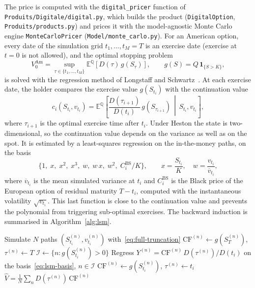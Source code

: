 \documentclass[11pt,a4paper]{article}
\theoremstyle{remark}
\newcommand{\E}{\mathbb{E}}
\newcommand{\Q}{\mathbb{Q}}
\newcommand{\ind}{\mathbf{1}}
\newcommand{\code}[1]{\texttt{#1}}
\begin{document}
The price is computed with the \code{digital\_pricer} function of
\code{Produits/Digitale/digital.py}, which builds the product
(\code{DigitalOption}, \code{Produits/products.py}) and prices it with the
model-agnostic Monte Carlo engine \code{MonteCarloPricer}
(\code{Model/monte\_carlo.py}). For an American option, every date of the
simulation grid $t_1, \dots, t_M = T$ is an exercise date (exercise at $t=0$ is
not allowed), and the optimal stopping problem
\begin{equation}
  V^{\mathrm{Am}}_0 = \sup_{\tau \in \{t_1,\dots,t_M\}} \E^{\Q}\!\left[D(\tau)\,g(S_\tau)\right],
  \qquad g(S) = Q\,\ind_{\{S > K\}},
\end{equation}
is solved with the regression method of Longstaff and Schwartz~\cite{LongstaffSchwartz2001}.
At each exercise date, the holder compares the exercise value $g(S_{t_i})$ with
the continuation value
\begin{equation}
  c_i(S_{t_i}, v_{t_i}) = \E^{\Q}\!\left[\frac{D(\tau_{i+1})}{D(t_i)}\,g(S_{\tau_{i+1}})
  \,\middle|\, S_{t_i}, v_{t_i}\right],
\end{equation}
where $\tau_{i+1}$ is the optimal exercise time after $t_i$. Under Heston the
state is two-dimensional, so the continuation value depends on the variance as
well as on the spot. It is estimated by a least-squares regression on the
in-the-money paths, on the basis
\begin{equation}
  \bigl\{1,\; x,\; x^2,\; x^3,\; w,\; w\,x,\; w^2,\; C^{\mathrm{BS}}_i/K\bigr\},
  \qquad x = \frac{S_{t_i}}{K},\quad w = \frac{v_{t_i}}{\overline{v}_{t_i}},
  \label{eq:lsm-basis}
\end{equation}
where $\overline{v}_{t_i}$ is the mean simulated variance at $t_i$ and
$C^{\mathrm{BS}}_i$ is the Black price of the European option of residual
maturity $T - t_i$, computed with the instantaneous volatility
$\sqrt{v_{t_i}}$. This last function is close to the continuation value and
prevents the polynomial from triggering sub-optimal exercises. The backward
induction is summarised in Algorithm~\ref{alg:lsm}.

\begin{algorithm}[htbp]
\caption{Longstaff--Schwartz pricing of an early-exercise digital}
\label{alg:lsm}
\begin{algorithmic}[1]
\State Simulate $N$ paths $(S_{t_i}^{(n)}, v_{t_i}^{(n)})$ with~\eqref{eq:full-truncation}
\State $\mathrm{CF}^{(n)} \gets g(S_T^{(n)})$, \quad $\tau^{(n)} \gets T$ 
  \State $\mathcal{I} \gets \{n : g(S_{t_i}^{(n)}) > 0\}$ 
  \State Regress $Y^{(n)} = \mathrm{CF}^{(n)}\,D(\tau^{(n)})/D(t_i)$ on the basis~\eqref{eq:lsm-basis}, $n \in \mathcal{I}$
    \State $\mathrm{CF}^{(n)} \gets g(S_{t_i}^{(n)})$, \quad $\tau^{(n)} \gets t_i$ 
  \EndFor
\EndFor
\State \Return $\hat V = \frac{1}{N}\sum_{n} D(\tau^{(n)})\,\mathrm{CF}^{(n)}$
\end{algorithmic}
\end{algorithm}
\end{document}
